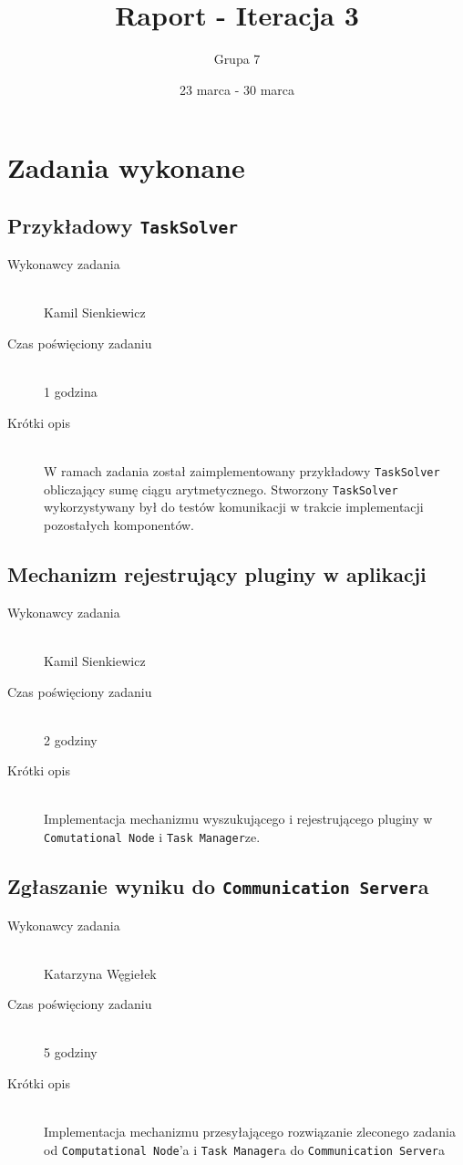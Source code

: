 \documentclass[a4paper]{article}
\title{Raport - Iteracja 3}
\date{23 marca - 30 marca}
\author{Grupa 7}
\begin{document}
\maketitle

\section{Zadania wykonane}
\subsection{Przykładowy \texttt{TaskSolver}}
\begin{description}
    \item[Wykonawcy zadania] \hfill \\ Kamil Sienkiewicz
    \item[Czas poświęciony zadaniu] \hfill \\ 1 godzina
    \item[Krótki opis] \hfill \\ W ramach zadania został zaimplementowany przykładowy \texttt{TaskSolver} obliczający sumę ciągu arytmetycznego. Stworzony \texttt{TaskSolver} wykorzystywany był do testów komunikacji w trakcie implementacji pozostałych komponentów.
\end{description}

\subsection{Mechanizm rejestrujący pluginy w aplikacji}
\begin{description}
    \item[Wykonawcy zadania] \hfill \\ Kamil Sienkiewicz
    \item[Czas poświęciony zadaniu] \hfill \\ 2 godziny
    \item[Krótki opis] \hfill \\ Implementacja mechanizmu wyszukującego i rejestrującego pluginy w \texttt{Comutational Node} i \texttt{Task Manager}ze.
\end{description}

\subsection{Zgłaszanie wyniku do \texttt{Communication Server}a}
\begin{description}
    \item[Wykonawcy zadania] \hfill \\ Katarzyna Węgiełek
    \item[Czas poświęciony zadaniu] \hfill \\ 5 godziny
    \item[Krótki opis] \hfill \\ Implementacja mechanizmu przesyłającego rozwiązanie zleconego zadania od \texttt{Computational Node}'a i \texttt{Task Manager}a do \texttt{Communication Server}a
\end{description}
\end{document}
